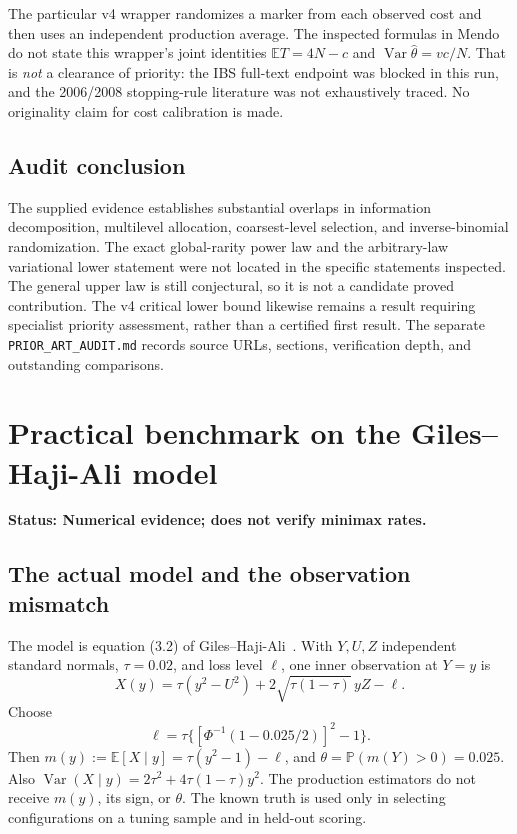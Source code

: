 \documentclass[11pt]{article}
\theoremstyle{definition}\newtheorem{conjecture}[theorem]{Conjecture}
\theoremstyle{remark}\newtheorem{remark}[theorem]{Remark}
\newcommand{\E}{\mathbb E}\newcommand{\PP}{\mathbb P}\newcommand{\R}{\mathbb R}
\newcommand{\Var}{\operatorname{Var}}\newcommand{\TV}{\operatorname{TV}}
\newcommand{\status}[1]{\par\smallskip\noindent\textbf{Status: #1.}\par}
\begin{document}
The particular v4 wrapper randomizes a marker from each observed cost and then uses an independent production average. The inspected formulas in Mendo do not state this wrapper's joint identities $\E T=4N-c$ and $\Var\widehat\theta=vc/N$. That is \emph{not} a clearance of priority: the IBS full-text endpoint was blocked in this run, and the 2006/2008 stopping-rule literature was not exhaustively traced. No originality claim for cost calibration is made.

\subsection{Audit conclusion}
The supplied evidence establishes substantial overlaps in information decomposition, multilevel allocation, coarsest-level selection, and inverse-binomial randomization. The exact global-rarity power law and the arbitrary-law variational lower statement were not located in the specific statements inspected. The general upper law is still conjectural, so it is not a candidate proved contribution. The v4 critical lower bound likewise remains a result requiring specialist priority assessment, rather than a certified first result. The separate \texttt{PRIOR\_ART\_AUDIT.md} records source URLs, sections, verification depth, and outstanding comparisons.

\section{Practical benchmark on the Giles--Haji-Ali model}\label{sec:benchmark}
\status{Numerical evidence; does not verify minimax rates}
\subsection{The actual model and the observation mismatch}
The model is equation (3.2) of Giles--Haji-Ali~\cite{gha}. With $Y,U,Z$ independent standard normals, $\tau=0.02$, and loss level $\ell$, one inner observation at $Y=y$ is
\begin{equation}\label{eq:model}
 X(y)=\tau(y^2-U^2)+2\sqrt{\tau(1-\tau)}\,yZ-\ell.
\end{equation}
Choose
\[
 \ell=\tau\{[\Phi^{-1}(1-0.025/2)]^2-1\}.
\]
Then $m(y):=\E[X\mid y]=\tau(y^2-1)-\ell$, and
$\theta=\PP(m(Y)>0)=0.025$. Also
$\Var(X\mid y)=2\tau^2+4\tau(1-\tau)y^2$.
The production estimators do not receive $m(y)$, its sign, or $\theta$. The known truth is used only in selecting configurations on a tuning sample and in held-out scoring.
\end{document}
